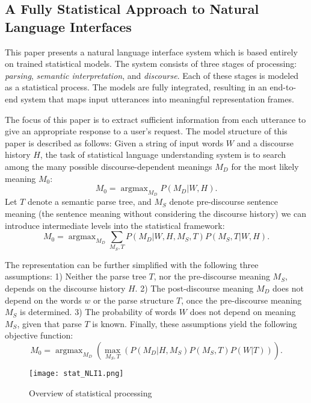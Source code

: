 \subsection{A Fully Statistical Approach to Natural Language Interfaces \cite{Miller1996}}

This paper presents a natural language interface system which is based entirely on trained statistical models. The system consists of three stages of processing: \emph{parsing}, \emph{semantic interpretation}, and \emph{discourse}. Each of these stages is modeled as a statistical process. The models are fully integrated, resulting in an end-to-end system that maps input utterances into meaningful representation frames.

The focus of this paper is to extract sufficient information from each utterance to give an appropriate response to a user's request. The model structure of this paper is described as follows: Given a string of input words $W$ and a discourse history $H$, the task of statistical language understanding system is to search among the many possible discourse-dependent meanings $M_D$ for the most likely meaning $M_0$:
$$M_0 = \mathop{\arg \max}_{M_D} P(M_D | W, H).$$
Let $T$ denote a semantic parse tree, and $M_S$ denote pre-discourse sentence meaning (the sentence meaning without considering the discourse history) we can introduce intermediate levels into the statistical framework:
$$M_0 = \mathop{\arg \max}_{M_D} \sum_{M_S, T} P(M_D | W, H, M_S, T) P(M_S, T | W, H).$$

The representation can be further simplified with the following three assumptions: 1) Neither the parse tree $T$, nor the pre-discourse meaning $M_S$, depends on the discourse history $H$. 2) The post-discourse meaning $M_D$ does not depend on the words $w$ or the parse structure $T$, once the pre-discourse meaning $M_S$ is determined. 3) The probability of words $W$ does not depend on meaning $M_S$, given that parse $T$ is known. Finally, these assumptions yield the following objective function:
$$M_0 = \mathop{\arg \max}_{M_D} (\max_{M_S, T}(P( M_D | H, M_S) P(M_S, T) P(W | T))).$$
\begin{figure}[h]
  \centering
  \texttt{[image: stat\_NLI1.png]}\\
  \caption{Overview of statistical processing}\label{fig:stat_NLI1}
\end{figure}

